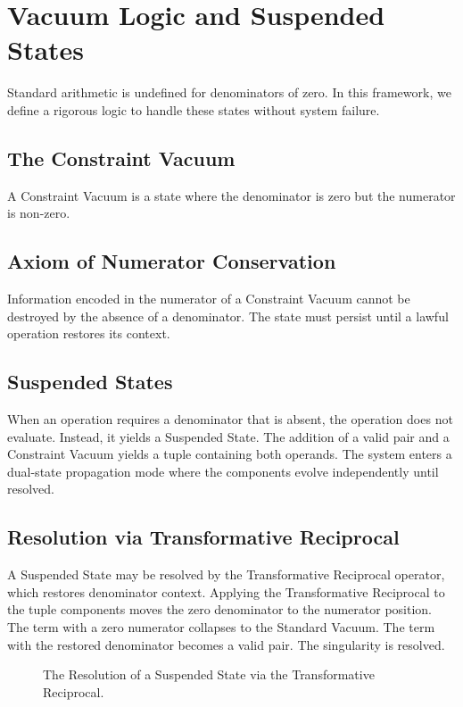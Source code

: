 \documentclass[11pt, letterpaper]{article}
\newcommand{\psiOp}{\psi}
\begin{document}
\section{Vacuum Logic and Suspended States}\label{sec:vacuum-logic}

Standard arithmetic is undefined for denominators of zero. In this framework, we define a rigorous logic to handle these states without system failure.

\subsection{The Constraint Vacuum}
A Constraint Vacuum is a state where the denominator is zero but the numerator is non-zero.

\subsection{Axiom of Numerator Conservation}
Information encoded in the numerator of a Constraint Vacuum cannot be destroyed by the absence of a denominator. The state must persist until a lawful operation restores its context.

\subsection{Suspended States}
When an operation requires a denominator that is absent, the operation does not evaluate. Instead, it yields a Suspended State. The addition of a valid pair and a Constraint Vacuum yields a tuple containing both operands. The system enters a dual-state propagation mode where the components evolve independently until resolved.

\subsection{Resolution via Transformative Reciprocal}
A Suspended State may be resolved by the Transformative Reciprocal operator, which restores denominator context. Applying the Transformative Reciprocal to the tuple components moves the zero denominator to the numerator position. The term with a zero numerator collapses to the Standard Vacuum. The term with the restored denominator becomes a valid pair. The singularity is resolved.

\begin{figure}[h]
\centering
{}
\caption{The Resolution of a Suspended State via the Transformative Reciprocal.}
\end{figure}
\end{document}

